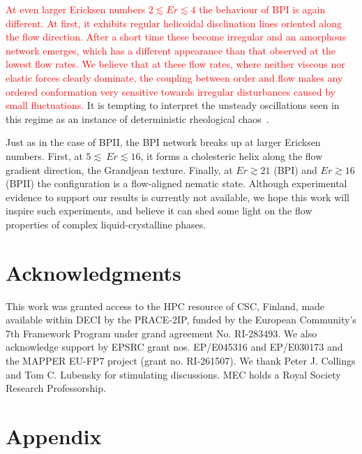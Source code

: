 \documentclass[8.5pt,twoside,twocolumn]{article}
\newcommand{\rev}[1]{{\textcolor{red}{#1}}}
\begin{document}
\rev{
At even larger Ericksen numbers $2\lesssim Er \lesssim 4$ the behaviour of BPI is again different.
At first, it exhibits regular helicoidal disclination lines oriented along the flow direction.
After a short time these become irregular and an amorphous network emerges, which has 
a different appearance than that observed at the lowest flow rates.
We believe that at these flow rates, where neither viscous nor elastic forces clearly dominate, 
the coupling between order and flow makes any ordered conformation very sensitive towards 
irregular disturbances caused by small fluctuations.
}
It is tempting to
interpret the unsteady oscillations seen in this regime as an instance of 
deterministic rheological chaos~\cite{fielding, Cates:2002}.

Just as in the case of BPII, the BPI network breaks up at larger Ericksen numbers. 
First, at $5\lesssim\ Er\lesssim 16$, it forms a cholesteric helix along the flow gradient 
direction, the Grandjean texture. Finally, at $Er\gtrsim21$ (BPI) and $Er\gtrsim16$ (BPII) the configuration
is a flow-aligned nematic state.
Although experimental evidence to support
our results is currently not available, we hope this work will inspire such experiments, 
and believe it can shed some light on the flow properties of complex liquid-crystalline phases.

\section*{Acknowledgments}

This work was granted access to the HPC resource of CSC, Finland, made available 
within DECI by the PRACE-2IP, funded by the European Community's 7th Framework 
Program under grand agreement No. RI-283493. We also acknowledge support by 
EPSRC grant nos. EP/E045316 and EP/E030173 and the MAPPER EU-FP7 project 
(grant no. RI-261507). We thank Peter J. Collings and Tom C. Lubensky for stimulating discussions. 
MEC holds a Royal Society Research Professorship.

\appendix
\section*{Appendix}
\end{document}
